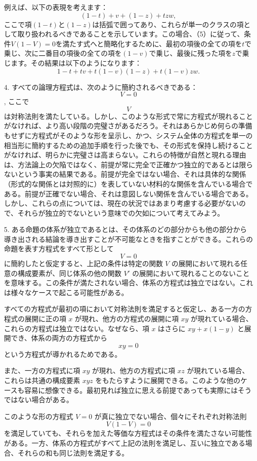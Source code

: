 \documentclass[a4paper,11pt,openany]{ltjsbook}
\begin{document}
例えば、以下の表現を考えます：
\[
(1 - t) + v + (1 - z) + tzw,
\]
ここで項$(1-t)$と$(1-z)$は括弧で囲ってあり、これらが単一のクラスの項として取り扱われるべきであることを示しています。この場合、（5）に従って、条件$V(1-V)=0$を満たす式へと簡略化するために、最初の項後の全ての項を$t$で乗じ、次に二番目の項後の全ての項を$(1-v)$で乗じ、最後に残った項を$z$で乗じます。その結果は以下のようになります：
\[
1 - t + tv + t(1 - v)(1 - z) + t(1 - v)zw.
\]

4. すべての論理方程式は、次のように簡約されるべきである：
$$V=0$$,
ここで $$V$$ は対称法則を満たしている。しかし、このような形式で常に方程式が現れることがなければ、より高い段階の完璧さがあるだろう。それはあらかじめ何らの準備もせずに方程式がそのような形を呈示し、かつ、システム全体の方程式を単一の相当形に簡約するための追加手順を行った後でも、その形式を保持し続けることがなければ、明らかに完璧さは高まらない。これらの特徴が自然と現れる理由は、方法論上の欠陥ではなく、前提が常に完全で正確かつ独立的であるとは限らないという事実の結果である。前提が完全ではない場合、それは具体的な関係（形式的な関係とは対照的に）を表していない材料的な関係を含んでいる場合である。前提が正確でない場合、それは意図しない関係を含んでいる場合である。しかし、これらの点については、現在の状況ではあまり考慮する必要がないので、それらが独立的でないという意味での欠如について考えてみよう。

5. ある命題の体系が独立であるとは、その体系のどの部分からも他の部分から導き出される結論を導き出すことが不可能なときを指すことができる。これらの命題を表す方程式をすべて形として
\[
V=0
\]
に簡約したと仮定すると、上記の条件は特定の関数 $V$ の展開において現れる任意の構成要素が、同じ体系の他の関数 $V'$ の展開において現れることのないことを意味する。この条件が満たされない場合、体系の方程式は独立ではない。これは様々なケースで起こる可能性がある。

すべての方程式が最初の項において対称法則を満足すると仮定し、ある一方の方程式の展開に正の項 $x$ が現れ、他方の方程式の展開に項 $xy$ が現れている場合、これらの方程式は独立ではない。なぜなら、項 $x$ はさらに $xy + x(1 - y)$ と展開でき、体系の両方の方程式から
\[
xy=0
\]
という方程式が導かれるためである。

また、一方の方程式に項 $xy$ が現れ、他方の方程式に項 $xz$ が現れている場合、これらは共通の構成要素 $xyz$ をもたらすように展開できる。このような他のケースも容易に想像できる。最初見れば独立に思える前提であっても実際にはそうではない場合がある。

このような形の方程式 $V = 0$ が真に独立でない場合、個々にそれぞれ対称法則
\[
V(1 - V) = 0
\]
を満足していても、それらを加えた等価な方程式はその条件を満たさない可能性がある。一方、体系の方程式がすべて上記の法則を満足し、互いに独立である場合、それらの和も同じ法則を満足する。
\end{document}
